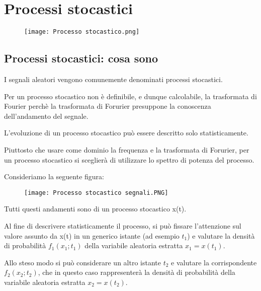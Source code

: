 \chapter{Processi stocastici}

\begin{figure}[h]
    \centering
    \texttt{[image: Processo stocastico.png]}
\end{figure}   

\newpage 

\section{Processi stocastici: cosa sono}

I segnali aleatori vengono comunemente denominati processi stocastici. \newline 

Per un processo stocastico non è definibile, e dunque calcolabile, la trasformata di Fourier perchè 
la trasformata di Forurier presuppone la conoscenza dell'andamento del segnale. \newline 

L'evoluzione di un processo stocastico può essere descritto solo statisticamente. \newline 

Piuttosto che usare come dominio la frequenza e la trasformata di Forurier, 
per un processo stocastico si sceglierà di utilizzare lo spettro di potenza del processo. \newline 

Consideriamo la seguente figura: 

\begin{figure}[h]
    \centering
    \texttt{[image: Processo stocastico segnali.PNG]}
\end{figure}  

Tutti questi andamenti sono di un processo stocastico x(t). \newline 

Al fine di descrivere statisticamente il processo, si può fissare l'attenzione sul valore assunto da x(t) in un generico istante (ad esempio $t_1$) 
e valutare la densità di probabilità $f_1 (x_1; t_1)$ della variabile aleatoria estratta $x_1 = x(t_1)$. \newline 

Allo steso modo si può considerare un altro istante $t_2$ e valutare la corrispondente $f_2 (x_2; t_2)$, 
che in questo caso rappresenterà la densità di probabilità della variabile aleatoria estratta $x_2 = x(t_2)$. \newline 

